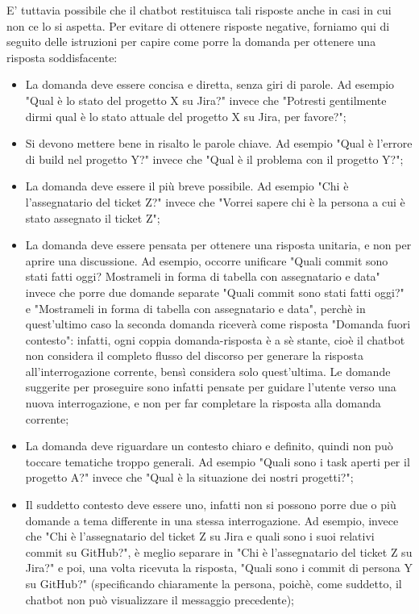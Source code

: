 E' tuttavia possibile che il chatbot restituisca tali risposte anche in casi in cui non ce lo si aspetta.
Per evitare di ottenere risposte negative, forniamo qui di seguito delle istruzioni per capire come porre la domanda per
ottenere una risposta soddisfacente:
\begin{itemize}
    \item La domanda deve essere concisa e diretta, senza giri di parole. Ad esempio "Qual è lo stato del progetto X su Jira?" invece
    che "Potresti gentilmente dirmi qual è lo stato attuale del progetto X su Jira, per favore?";
    \item Si devono mettere bene in risalto le parole chiave. Ad esempio "Qual è l'errore di build nel progetto Y?" invece che "Qual
    è il problema con il progetto Y?";
    \item La domanda deve essere il più breve possibile. Ad esempio "Chi è l'assegnatario del ticket Z?" invece che "Vorrei sapere
    chi è la persona a cui è stato assegnato il ticket Z";
    \item La domanda deve essere pensata per ottenere una risposta unitaria, e non per aprire una discussione. Ad esempio, occorre
    unificare "Quali commit sono stati fatti oggi? Mostrameli in forma di tabella con assegnatario e data" invece che porre due domande
    separate "Quali commit sono stati fatti oggi?" e "Mostrameli in forma di tabella con assegnatario e data", perchè in quest'ultimo
    caso la seconda domanda riceverà come risposta "Domanda fuori contesto": infatti, ogni coppia domanda-risposta è a sè stante, cioè
    il chatbot non considera il completo flusso del discorso per generare la risposta all'interrogazione corrente, bensì considera solo
    quest'ultima. Le domande suggerite per proseguire sono infatti pensate per guidare l'utente verso una nuova interrogazione, e non per far
    completare la risposta alla domanda corrente;
    \item La domanda deve riguardare un contesto chiaro e definito, quindi non può toccare tematiche troppo generali. Ad esempio
    "Quali sono i task aperti per il progetto A?" invece che "Qual è la situazione dei nostri progetti?";
    \item Il suddetto contesto deve essere uno, infatti non si possono porre due o più domande a tema differente in una stessa
    interrogazione. Ad esempio, invece che "Chi è l'assegnatario del ticket Z su Jira
    e quali sono i suoi relativi commit su GitHub?", è meglio separare in "Chi è l'assegnatario del ticket Z su Jira?" e poi, una 
    volta ricevuta la risposta, "Quali sono i commit di persona Y su GitHub?" (specificando chiaramente la persona, poichè, come suddetto, il chatbot non può visualizzare il messaggio precedente);

\end{itemize}

